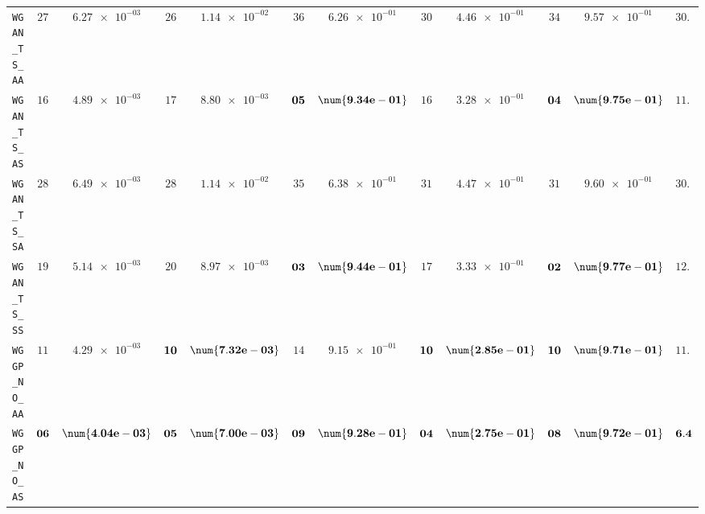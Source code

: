 \begin{xltabular}{\textwidth}{l||cC|cC|cC|cC|cC||c}
	\texttt{WGAN\_TS\_AA} & $ 27$ & $ \num{6.27e-03}$ & $ 26$ & $ \num{1.14e-02}$ & $ 36$ & $ \num{6.26e-01}$ & $ 30$ & $ \num{4.46e-01}$ & $ 34$ & $ \num{9.57e-01}$ & $ 30.6$  \\
	\texttt{WGAN\_TS\_AS} & $ 16$ & $ \num{4.89e-03}$ & $ 17$ & $ \num{8.80e-03}$ & $\bf 05$ & $\bf \num{9.34e-01}$ & $ 16$ & $ \num{3.28e-01}$ & $\bf 04$ & $\bf \num{9.75e-01}$ & $ 11.6$  \\
	\texttt{WGAN\_TS\_SA} & $ 28$ & $ \num{6.49e-03}$ & $ 28$ & $ \num{1.14e-02}$ & $ 35$ & $ \num{6.38e-01}$ & $ 31$ & $ \num{4.47e-01}$ & $ 31$ & $ \num{9.60e-01}$ & $ 30.6$  \\
	\texttt{WGAN\_TS\_SS} & $ 19$ & $ \num{5.14e-03}$ & $ 20$ & $ \num{8.97e-03}$ & $\bf 03$ & $\bf \num{9.44e-01}$ & $ 17$ & $ \num{3.33e-01}$ & $\bf 02$ & $\bf \num{9.77e-01}$ & $ 12.2$  \\ \hline
	\texttt{WGGP\_NO\_AA} & $ 11$ & $ \num{4.29e-03}$ & $\bf 10$ & $\bf \num{7.32e-03}$ & $ 14$ & $ \num{9.15e-01}$ & $\bf 10$ & $\bf \num{2.85e-01}$ & $\bf 10$ & $\bf \num{9.71e-01}$ & $ 11.0$  \\
	\texttt{WGGP\_NO\_AS} & $\bf 06$ & $\bf \num{4.04e-03}$ & $\bf 05$ & $\bf \num{7.00e-03}$ & $\bf 09$ & $\bf \num{9.28e-01}$ & $\bf 04$ & $\bf \num{2.75e-01}$ & $\bf 08$ & $\bf \num{9.72e-01}$ & $\bf 6.4$  \\

\end{xltabular}
